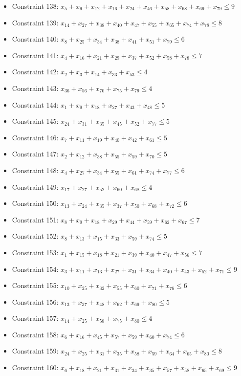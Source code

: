 \documentclass[11pt]{article}
\begin{document}
\begin{itemize}
\item Constraint 138: $x_{5} + x_{9} + x_{12} + x_{16} + x_{24} + x_{46} + x_{58} + x_{68} + x_{69} + x_{79} \le 9$
\item Constraint 139: $x_{14} + x_{27} + x_{38} + x_{40} + x_{47} + x_{55} + x_{65} + x_{74} + x_{78} \le 8$
\item Constraint 140: $x_{8} + x_{25} + x_{34} + x_{38} + x_{41} + x_{51} + x_{79} \le 6$
\item Constraint 141: $x_{4} + x_{16} + x_{21} + x_{29} + x_{37} + x_{52} + x_{58} + x_{78} \le 7$
\item Constraint 142: $x_{2} + x_{3} + x_{14} + x_{33} + x_{53} \le 4$
\item Constraint 143: $x_{36} + x_{56} + x_{70} + x_{75} + x_{79} \le 4$
\item Constraint 144: $x_{1} + x_{9} + x_{18} + x_{27} + x_{43} + x_{48} \le 5$
\item Constraint 145: $x_{24} + x_{31} + x_{35} + x_{45} + x_{52} + x_{77} \le 5$
\item Constraint 146: $x_{7} + x_{11} + x_{19} + x_{40} + x_{42} + x_{61} \le 5$
\item Constraint 147: $x_{2} + x_{12} + x_{38} + x_{55} + x_{59} + x_{70} \le 5$
\item Constraint 148: $x_{4} + x_{27} + x_{34} + x_{55} + x_{61} + x_{74} + x_{77} \le 6$
\item Constraint 149: $x_{17} + x_{27} + x_{52} + x_{60} + x_{68} \le 4$
\item Constraint 150: $x_{13} + x_{24} + x_{35} + x_{37} + x_{50} + x_{68} + x_{72} \le 6$
\item Constraint 151: $x_{8} + x_{9} + x_{18} + x_{29} + x_{44} + x_{59} + x_{62} + x_{67} \le 7$
\item Constraint 152: $x_{8} + x_{13} + x_{15} + x_{33} + x_{59} + x_{74} \le 5$
\item Constraint 153: $x_{1} + x_{15} + x_{18} + x_{21} + x_{39} + x_{40} + x_{47} + x_{56} \le 7$
\item Constraint 154: $x_{3} + x_{11} + x_{13} + x_{27} + x_{31} + x_{34} + x_{40} + x_{43} + x_{52} + x_{71} \le 9$
\item Constraint 155: $x_{10} + x_{25} + x_{32} + x_{55} + x_{60} + x_{71} + x_{76} \le 6$
\item Constraint 156: $x_{13} + x_{37} + x_{48} + x_{62} + x_{69} + x_{80} \le 5$
\item Constraint 157: $x_{14} + x_{25} + x_{58} + x_{75} + x_{80} \le 4$
\item Constraint 158: $x_{6} + x_{16} + x_{45} + x_{57} + x_{59} + x_{60} + x_{74} \le 6$
\item Constraint 159: $x_{24} + x_{25} + x_{31} + x_{35} + x_{58} + x_{59} + x_{64} + x_{65} + x_{80} \le 8$
\item Constraint 160: $x_{6} + x_{18} + x_{21} + x_{31} + x_{34} + x_{35} + x_{57} + x_{58} + x_{65} + x_{69} \le 9$
\end{itemize}
\end{document}
